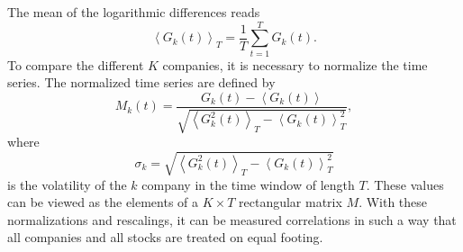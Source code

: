 The mean of the logarithmic differences reads \cite{exact_distributions_guhr}
\begin{equation}
    \left\langle G_{k} \left( t \right) \right\rangle_{T} = \frac{1}{T}
    \sum_{t = 1}^{T} G_{k} \left( t \right).
\end{equation}
To compare the different $K$ companies, it is necessary to normalize the time
series. The normalized time series are defined by
\cite{exact_distributions_guhr,non_stationarity_fin_guhr}
\begin{equation}
    M_{k} \left( t \right) = \frac{G_{k} \left( t \right) - \left\langle
    G_{k} \left( t \right) \right\rangle} {\sqrt{\left\langle G_{k}^{2}
    \left( t \right) \right\rangle_{T} - \left\langle G_{k} \left( t \right)
    \right\rangle^2_{T}}},
\end{equation}
where
\begin{equation}
    \sigma_{k} = \sqrt{\left\langle G_{k}^{2}
    \left( t \right) \right\rangle_{T} - \left\langle G_{k} \left( t \right)
    \right\rangle^2_{T}}
\end{equation}
is the volatility of the $k$ company in the time window of length $T$. These
values can be viewed as the elements of a $K \times T$ rectangular matrix $M$.
With these normalizations and rescalings, it can be measured correlations in
such a way that all companies and all stocks are treated on equal footing.

